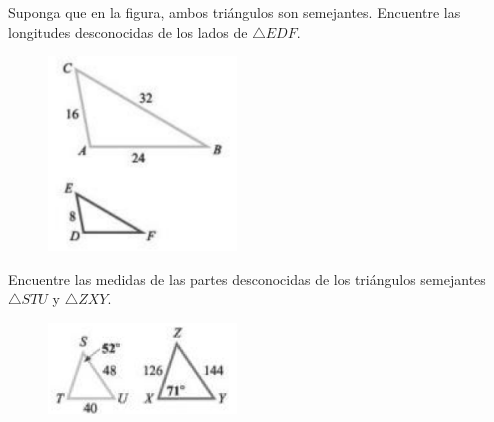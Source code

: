 {}
	\begin{problema}
		\label{exmp:9405}
		Suponga que en la figura, ambos triángulos son semejantes. Encuentre las longitudes desconocidas de los lados de $\triangle EDF.$
	\end{problema}
\begin{figure}
\centering
\includegraphics[width=5cm,keepaspectratio=true]{./trig/trig9446.png}
\label{fig:9446}
\end{figure}
	

{}
	\begin{problema}
		\label{exmp:9406}
		Encuentre las medidas de las partes desconocidas de los triángulos semejantes $\triangle STU$ y $\triangle ZXY.$ 
	\end{problema}


\begin{figure}
	\centering
	\includegraphics[width=5cm,keepaspectratio=true]{./trig/trig9447.png}
	\label{fig:9447}
\end{figure}
	

